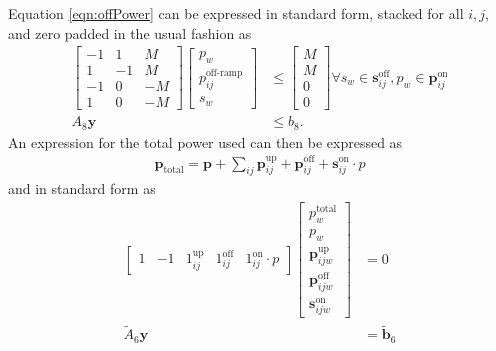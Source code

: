 	Equation \ref{eqn:offPower} can be expressed in standard form, stacked for all $i,j$, and zero padded in the usual fashion as 
\begin{equation}\begin{aligned} 
	\begin{bmatrix}
		-1 & 1 & M  \\
		1  & -1 & M \\
		-1 & 0 & -M \\
		1 & 0 & -M 
	\end{bmatrix}	
	\begin{bmatrix} p_w                      \\
		        p_{ij}^{\text{off-ramp}} \\
			s_w
	\end{bmatrix} &\le
	\begin{bmatrix} M \\
	                M \\
	                0 \\
	                0
	\end{bmatrix} \forall s_w \in \mathbf{s}_{ij}^{\text{off}}, p_w \in \mathbf{p}_{ij}^{\text{on}} \\
	A_8\mathbf{y} & \le b_8.
\end{aligned}\end{equation} 
An expression for the total power used can then be expressed as
\begin{equation}
	\begin{aligned}
		\mathbf{p}_{\text{total}} = \mathbf{p} + \sum_{ij} \mathbf{p}^{\text{up}}_{ij} + \mathbf{p}^{\text{off}}_{ij} + \mathbf{s}^{\text{on}}_{ij}\cdot p
	\end{aligned}
\end{equation}
and in standard form as
\begin{equation} \begin{aligned}
	\begin{bmatrix}
		1 & -1 & 1_{ij}^{\text{up}} & 1_{ij}^{\text{off}} & 1_{ij}^{\text{on}}\cdot p  
	\end{bmatrix}
	\begin{bmatrix}
		p^{\text{total}}_w            \\
		p_w                           \\
	        \mathbf{p}_{ijw}^{\text{up}}  \\
	        \mathbf{p}_{ijw}^{\text{off}} \\ 
	        \mathbf{s}_{ijw}^{\text{on}}
	\end{bmatrix} &= 0 \\
	\tilde{A}_6\mathbf{y} &= \tilde{\mathbf{b}}_6
\end{aligned} \end{equation}

